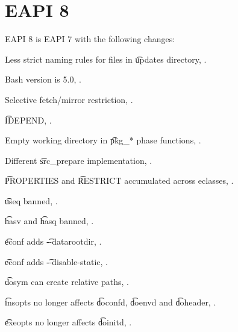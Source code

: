 \section{EAPI 8}

EAPI 8 is EAPI 7 with the following changes:

\begin{compactitem}
\item Less strict naming rules for files in \t{updates} directory, .
\item Bash version is 5.0, .
\item Selective fetch/mirror restriction, .
\item \t{IDEPEND}, .
\item Empty working directory in \t{pkg_*} phase functions, .
\item Different \t{src_prepare} implementation, .
\item \t{PROPERTIES} and \t{RESTRICT} accumulated across eclasses, .
\item \t{useq} banned, .
\item \t{hasv} and \t{hasq} banned, .
\item \t{econf} adds \t{-{}-datarootdir}, .
\item \t{econf} adds \t{-{}-disable-static}, .
\item \t{dosym} can create relative paths, .
\item \t{insopts} no longer affects \t{doconfd}, \t{doenvd} and \t{doheader}, .
\item \t{exeopts} no longer affects \t{doinitd}, .
\end{compactitem}




